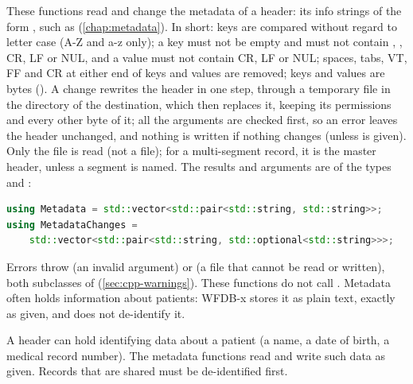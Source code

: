 These functions read and change the metadata of a header: its info strings of the form
, such as  (\cref{chap:metadata}). In short: keys are
compared without regard to letter case (A-Z and a-z only); a key must not be empty and
must not contain \code{:}, \code{\#}, CR, LF or NUL, and a value must not contain CR, LF
or NUL; spaces, tabs, VT, FF and CR at either end of keys and values are removed; keys and
values are bytes (). A change rewrites the header in one step, through a
temporary file in the directory of the destination, which then replaces it, keeping its
permissions and every other byte of it; all the arguments are checked first, so an error
leaves the header unchanged, and nothing is written if nothing changes (unless
 is given). Only the  file is read (not a  file); for a
multi-segment record, it is the master header, unless a segment is named. The results
and arguments are of the types  and :
\begin{lstlisting}[language=C++]
using Metadata = std::vector<std::pair<std::string, std::string>>;
using MetadataChanges =
    std::vector<std::pair<std::string, std::optional<std::string>>>;
\end{lstlisting}
Errors throw  (an invalid argument) or  (a file that
cannot be read or written), both subclasses of  (\cref{sec:cpp-warnings}).
These functions do not call . Metadata often holds information about
patients: WFDB-x stores it as plain text, exactly as given, and does not de-identify it.

\begin{phibox}
A header can hold identifying data about a patient (a name, a date of birth, a medical
record number). The metadata functions read and write such data as given. Records that
are shared must be de-identified first.
\end{phibox}

